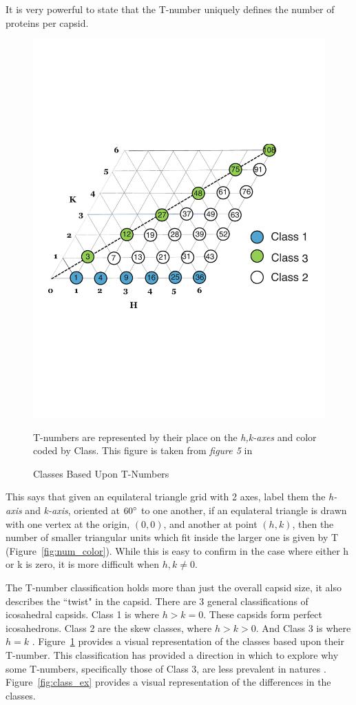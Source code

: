 \documentclass[12pt,letter]{article}
\begin{document}
It is very powerful to state that the T-number uniquely defines the number of proteins per capsid. 
\begin{figure}
	\vspace{-35pt}
	\centering
	\caption{Classes Based Upon T-Numbers}
	\includegraphics[width=.35\textwidth]{t_class.pdf}
	\begin{minipage}[h]{.3\textwidth}
		\begin{footnotesize}
		T-numbers are represented by their place on the \textit{h,k-axes} and color coded by Class. This figure is taken from \textit{figure 5} in \cite{Prasad:2012}
		\end{footnotesize}
	\end{minipage}
	\vspace{-50pt}
	\label{fig:t_class}
\end{figure}This says that given an equilateral triangle grid with 2 axes, label them the \textit{h-axis} and \textit{k-axis}, oriented at $60\degree$ to one another, if an equlateral triangle is drawn with one vertex at the origin, $(0,0)$, and another at point $(h,k)$, then the number of smaller triangular units which fit inside the larger one is given by T (Figure~\ref{fig:num_color}). While this is easy to confirm in the case where either h or k is zero, it is more difficult when $h, k \neq 0$.

The T-number classification holds more than just the overall capsid size, it also describes the ``twist" in the capsid. There are 3 general classifications of icosahedral capsids. Class 1 is where $h > k = 0$. These capsids form perfect icosahedrons. Class 2 are the skew classes, where $h > k > 0$. And Class 3 is where $h=k$ \cite{Mannige:2010} \cite[p 22-24]{Prasad:2012}. Figure~\ref{fig:t_class} provides a visual representation of the classes based upon their T-number. This classification has provided a direction in which to explore why some T-numbers, specifically those of Class 3, are less prevalent in natures \cite{Mannige:2010}. Figure~\ref{fig:class_ex} provides a visual representation of the differences in the classes.
\end{document}
